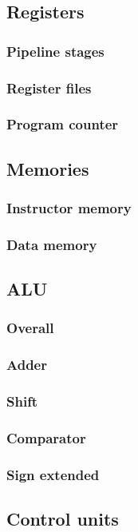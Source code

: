 \documentclass[11pt, a4paper, twoside]{IEEEtran}
\begin{document}
	\subsection{Registers}
		\subsubsection{Pipeline stages}
		\subsubsection{Register files}
		\subsubsection{Program counter}
	\subsection{Memories}
		\subsubsection{Instructor memory}
		\subsubsection{Data memory}
	\subsection{ALU}
		\subsubsection{Overall}
		\subsubsection{Adder}
		\subsubsection{Shift}
		\subsubsection{Comparator}
		\subsubsection{Sign extended}
	\subsection{Control units}
\end{document}
